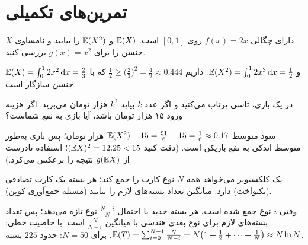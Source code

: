 \section{تمرین‌های تکمیلی}

\begin{exercise}
$X$ دارای چگالی $f(x)=2x$ روی $[0,1]$ است. $\mathbb{E}(X)$ و $\mathbb{E}(X^2)$ را بیابید و نامساوی جنسن را برای $g(x)=x^2$ بررسی کنید.
\end{exercise}
\begin{solution}
$\mathbb{E}(X)=\int_0^12x^2\,\mathrm{d} x=\frac23$ و $\mathbb{E}(X^2)=\int_0^12x^3\,\mathrm{d} x=\frac12$. داریم $\frac12\ge\big(\frac23\big)^2=\frac49\approx0.444$ که با جنسن سازگار است.
\end{solution}

\begin{exercise}
در یک بازی، تاسی پرتاب می‌کنید و اگر عدد $k$ بیاید $k^2$ هزار تومان می‌برید. اگر هزینه ورود ۱۵ هزار تومان باشد، آیا بازی به نفع شماست؟
\end{exercise}
\begin{solution}
سود متوسط $\mathbb{E}(X^2)-15=\frac{91}{6}-15=\frac16\approx0.17$ هزار تومان؛ پس بازی به‌طور متوسط اندکی به نفع بازیکن است. (دقت کنید $(\mathbb{E} X)^2=12.25<15$؛ استفاده نادرست از $g(\mathbb{E} X)$ نتیجه را برعکس می‌کرد.)
\end{solution}

\begin{exercise}
یک کلکسیونر می‌خواهد همه $N$ نوع کارت را جمع کند؛ هر بسته یک کارت تصادفی (یکنواخت) دارد. میانگین تعداد بسته‌های لازم را بیابید (مسئله جمع‌آوری کوپن).
\end{exercise}
\begin{solution}
وقتی $i$ نوع جمع شده است، هر بسته جدید با احتمال $\frac{N-i}{N}$ نوع تازه می‌دهد؛ پس تعداد بسته‌های لازم برای نوع بعدی هندسی با میانگین $\frac{N}{N-i}$ است. با خاصیت خطی:
$\mathbb{E}(T)=\sum_{i=0}^{N-1}\frac{N}{N-i}=N\big(1+\frac12+\cdots+\frac1N\big)\approx N\ln N$. برای $N=50$: حدود $225$ بسته.
\end{solution}
